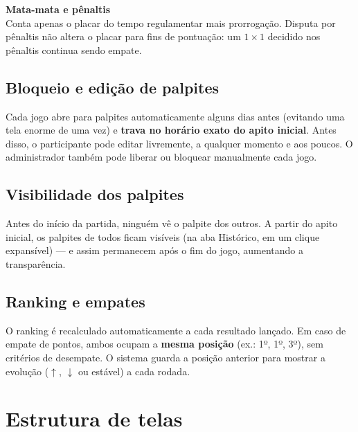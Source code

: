\documentclass[11pt,a4paper]{article}
\newcommand{\caixa}[2]{%
  \par\medskip\noindent
  \colorbox{verdeclaro}{\begin{minipage}{\dimexpr\linewidth-2\fboxsep}
  \textbf{\color{verde}#1}\\[0.3em]#2
  \end{minipage}}\par\medskip}
\begin{document}
\caixa{Mata-mata e pênaltis}{Conta apenas o placar do tempo regulamentar mais
prorrogação. Disputa por pênaltis não altera o placar para fins de pontuação:
um $1\times1$ decidido nos pênaltis continua sendo empate.}

\subsection{Bloqueio e edição de palpites}
Cada jogo abre para palpites automaticamente alguns dias antes (evitando uma
tela enorme de uma vez) e \textbf{trava no horário exato do apito inicial}.
Antes disso, o participante pode editar livremente, a qualquer momento e aos
poucos. O administrador também pode liberar ou bloquear manualmente cada jogo.

\subsection{Visibilidade dos palpites}
Antes do início da partida, ninguém vê o palpite dos outros. A partir do apito
inicial, os palpites de todos ficam visíveis (na aba Histórico, em um clique
expansível) --- e assim permanecem após o fim do jogo, aumentando a
transparência.

\subsection{Ranking e empates}
O ranking é recalculado automaticamente a cada resultado lançado. Em caso de
empate de pontos, ambos ocupam a \textbf{mesma posição} (ex.: 1º, 1º, 3º), sem
critérios de desempate. O sistema guarda a posição anterior para mostrar a
evolução ($\uparrow$, $\downarrow$ ou estável) a cada rodada.

\section{Estrutura de telas}
\end{document}
